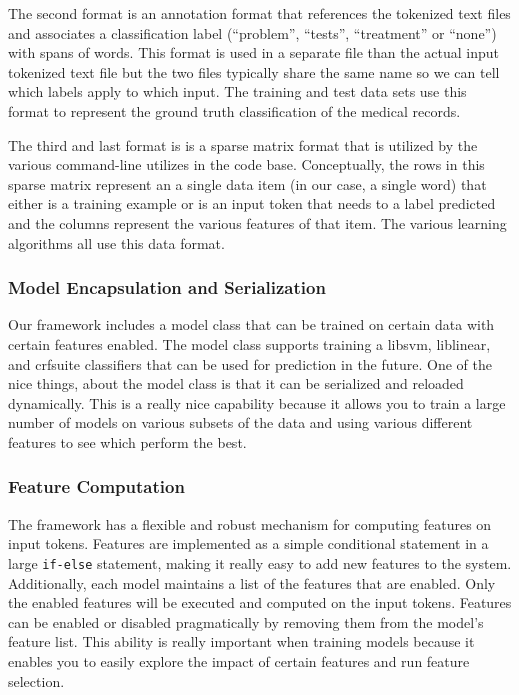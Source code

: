 \documentclass[preprint]{style}
\begin{document}
The second format is an annotation format that references the tokenized text files and associates a classification label (``problem'', ``tests'', ``treatment'' or ``none'') with spans of words. This format is used in a separate file than the actual input tokenized text file but the two files typically share the same name so we can tell which labels apply to which input. The training and test data sets use this format to represent the ground truth classification of the medical records.

The third and last format is is a sparse matrix format that is utilized by the various command-line utilizes in the code base. Conceptually, the rows in this sparse matrix represent an a single data item (in our case, a single word) that either is a training example or is an input token that needs to a label predicted and the columns represent the various features of that item. The various learning algorithms all use this data format.

\subsubsection{Model Encapsulation and Serialization}

Our framework includes a model class that can be trained on certain data with certain features enabled. The model class supports training a libsvm, liblinear, and crfsuite classifiers that can be used for prediction in the future. One of the nice things, about the model class is that it can be serialized and reloaded dynamically. This is a really nice capability because it allows you to train a large number of models on various subsets of the data and using various different features to see which perform the best.

\subsubsection{Feature Computation}

The framework has a flexible and robust mechanism for computing features on input tokens. Features are implemented as a simple conditional statement in a large {\tt if-else} statement, making it really easy to add new features to the system. Additionally, each model maintains a list of the features that are enabled. Only the enabled features will be executed and computed on the input tokens. Features can be enabled or disabled pragmatically by removing them from the model's feature list. This ability is really important when training models because it enables you to easily explore the impact of certain features and run feature selection.
\end{document}
